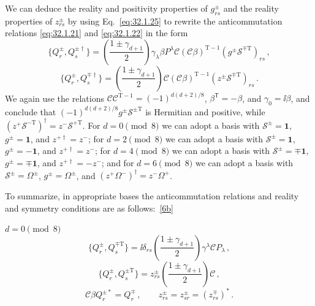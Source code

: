 We can deduce the reality and positivity properties of \(g_{rs}^{\pm}\)
and the reality properties of \(z_{rs}^{\pm}\) by using
Eq.~\eqref{eq:32.1.25} to rewrite the anticommutation relations
\eqref{eq:32.1.21} and \eqref{eq:32.1.22} in the form
\begin{equation}
  \{Q_r^\pm,Q_s^{\pm\dagger}\}
  =
  \left(\frac{1\pm\gamma_{d+1}}{2}\right)
  \gamma_\lambda\beta P^\lambda
  \mathcal C(\mathcal C\beta)^{\mathrm T-1}
  (g^\pm\mathcal S^{\mp\mathrm T})_{rs}\,,
  \tag{32.1.27}\label{eq:32.1.27}
\end{equation}
\begin{equation}
  \{Q_r^\pm,Q_s^{\mp\dagger}\}
  =
  \left(\frac{1\pm\gamma_{d+1}}{2}\right)
  \mathcal C(\mathcal C\beta)^{\mathrm T-1}
  (z^\pm\mathcal S^{\mp\mathrm T})_{rs}\,.
  \tag{32.1.28}\label{eq:32.1.28}
\end{equation}
We again use the relations
\(\mathcal C\mathcal C^{\mathrm T-1}=(-1)^{d(d+2)/8}\),
\(\beta^{\mathsf T}=-\beta\), and \(\gamma_0=\ii\beta\), and conclude that
\((-1)^{d(d+2)/8}g^\pm\mathcal S^{\pm\mathrm T}\) is Hermitian and
positive, while
\((z^+\mathcal S^{-\mathrm T})^\dagger=z^-\mathcal S^{+\mathrm T}\).
For \(d=0\pmod 8\) we can adopt a basis with
\(\mathcal S^\pm=\mathbf{1}\), \(g^\pm=\mathbf{1}\), and
\(z^{+\dagger}=z^-\); for \(d=2\pmod 8\) we can adopt a basis with
\(\mathcal S^\pm=\mathbf{1}\), \(g^\pm=-\mathbf{1}\), and
\(z^{+\dagger}=z^-\); for \(d=4\pmod 8\) we can adopt a basis with
\(\mathcal S^\pm=\mp\mathbf{1}\), \(g^\pm=\mp\mathbf{1}\), and
\(z^{+\dagger}=-z^-\); and for \(d=6\pmod 8\) we can adopt a basis with
\(\mathcal S^\pm=\Omega^\pm\), \(g^\pm=\Omega^\pm\), and
\((z^+\Omega^-)^\dagger=z^-\Omega^+\).

To summarize, in appropriate bases the anticommutation relations and reality
and symmetry conditions are as follows:~\hyperref[ch32-ref-6b]{[6b]}

\medskip
\noindent \(d=0\pmod 8\)
\begin{equation}
  \{Q_r^\pm,Q_s^{\mp\mathrm T}\}
  =\ii\delta_{rs}
  \left(\frac{1\pm\gamma_{d+1}}{2}\right)
  \gamma^\lambda\mathcal C P_\lambda\,,
  \tag{32.1.29}\label{eq:32.1.29}
\end{equation}
\begin{equation}
  \{Q_r^\pm,Q_s^{\pm\mathrm T}\}
  =z_{rs}^{\pm}
  \left(\frac{1\pm\gamma_{d+1}}{2}\right)\mathcal C\,,
  \tag{32.1.30}\label{eq:32.1.30}
\end{equation}
\begin{equation}
  \mathcal C\beta Q_r^{\pm*}=Q_r^\mp\,,
  \qquad
  z_{rs}^{\pm}=z_{sr}^{\pm}=(z_{rs}^{\mp})^*\,.
  \tag{32.1.31}\label{eq:32.1.31}
\end{equation}

